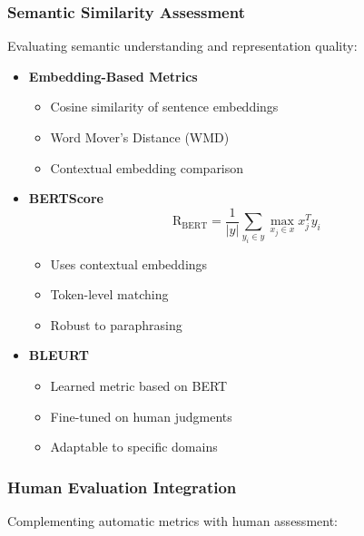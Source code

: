 \subsubsection{Semantic Similarity Assessment}
\noindent
Evaluating semantic understanding and representation quality:

\begin{itemize}
    \item \textbf{Embedding-Based Metrics}
    \begin{itemize}
        \item Cosine similarity of sentence embeddings
        \item Word Mover's Distance (WMD)
        \item Contextual embedding comparison
    \end{itemize}
    
    \item \textbf{BERTScore}
    \begin{equation}
        \text{R}_\text{BERT} = \frac{1}{|y|} \sum_{y_i \in y} \max_{x_j \in x} x_j^T y_i
    \end{equation}
    \begin{itemize}
        \item Uses contextual embeddings
        \item Token-level matching
        \item Robust to paraphrasing
    \end{itemize}
    
    \item \textbf{BLEURT}
    \begin{itemize}
        \item Learned metric based on BERT
        \item Fine-tuned on human judgments
        \item Adaptable to specific domains
    \end{itemize}
\end{itemize}

\subsubsection{Human Evaluation Integration}
\noindent
Complementing automatic metrics with human assessment:

